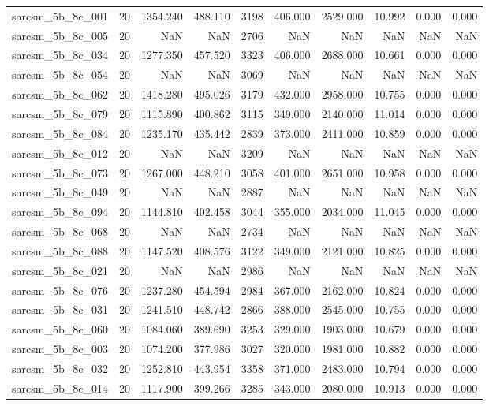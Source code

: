 \begin{tabular}{lrrrrrrrrr}
sarcsm\_5b\_8c\_001 & 20 & 1354.240 & 488.110 & 3198 & 406.000 & 2529.000 & 10.992 & 0.000 & 0.000 \\
sarcsm\_5b\_8c\_005 & 20 & NaN & NaN & 2706 & NaN & NaN & NaN & NaN & NaN \\
sarcsm\_5b\_8c\_034 & 20 & 1277.350 & 457.520 & 3323 & 406.000 & 2688.000 & 10.661 & 0.000 & 0.000 \\
sarcsm\_5b\_8c\_054 & 20 & NaN & NaN & 3069 & NaN & NaN & NaN & NaN & NaN \\
sarcsm\_5b\_8c\_062 & 20 & 1418.280 & 495.026 & 3179 & 432.000 & 2958.000 & 10.755 & 0.000 & 0.000 \\
sarcsm\_5b\_8c\_079 & 20 & 1115.890 & 400.862 & 3115 & 349.000 & 2140.000 & 11.014 & 0.000 & 0.000 \\
sarcsm\_5b\_8c\_084 & 20 & 1235.170 & 435.442 & 2839 & 373.000 & 2411.000 & 10.859 & 0.000 & 0.000 \\
sarcsm\_5b\_8c\_012 & 20 & NaN & NaN & 3209 & NaN & NaN & NaN & NaN & NaN \\
sarcsm\_5b\_8c\_073 & 20 & 1267.000 & 448.210 & 3058 & 401.000 & 2651.000 & 10.958 & 0.000 & 0.000 \\
sarcsm\_5b\_8c\_049 & 20 & NaN & NaN & 2887 & NaN & NaN & NaN & NaN & NaN \\
sarcsm\_5b\_8c\_094 & 20 & 1144.810 & 402.458 & 3044 & 355.000 & 2034.000 & 11.045 & 0.000 & 0.000 \\
sarcsm\_5b\_8c\_068 & 20 & NaN & NaN & 2734 & NaN & NaN & NaN & NaN & NaN \\
sarcsm\_5b\_8c\_088 & 20 & 1147.520 & 408.576 & 3122 & 349.000 & 2121.000 & 10.825 & 0.000 & 0.000 \\
sarcsm\_5b\_8c\_021 & 20 & NaN & NaN & 2986 & NaN & NaN & NaN & NaN & NaN \\
sarcsm\_5b\_8c\_076 & 20 & 1237.280 & 454.594 & 2984 & 367.000 & 2162.000 & 10.824 & 0.000 & 0.000 \\
sarcsm\_5b\_8c\_031 & 20 & 1241.510 & 448.742 & 2866 & 388.000 & 2545.000 & 10.755 & 0.000 & 0.000 \\
sarcsm\_5b\_8c\_060 & 20 & 1084.060 & 389.690 & 3253 & 329.000 & 1903.000 & 10.679 & 0.000 & 0.000 \\
sarcsm\_5b\_8c\_003 & 20 & 1074.200 & 377.986 & 3027 & 320.000 & 1981.000 & 10.882 & 0.000 & 0.000 \\
sarcsm\_5b\_8c\_032 & 20 & 1252.810 & 443.954 & 3358 & 371.000 & 2483.000 & 10.794 & 0.000 & 0.000 \\
sarcsm\_5b\_8c\_014 & 20 & 1117.900 & 399.266 & 3285 & 343.000 & 2080.000 & 10.913 & 0.000 & 0.000 \\

\end{tabular}
